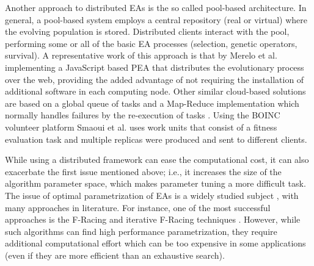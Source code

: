 Another approach to distributed EAs is the so called pool-based architecture. In general, a 
pool-based system employs a central repository (real or virtual) where the evolving population is stored.
Distributed clients interact with the pool, performing some or all of the basic EA processes 
(selection, genetic operators, survival). A representative work of this approach 
is that by Merelo et al. \cite{agajaj} implementing a JavaScript based PEA that distributes 
the evolutionary process over the web, providing the added advantage of not requiring the 
installation of additional software in each computing node.  Other similar cloud-based solutions 
are based on a global queue of tasks and a Map-Reduce implementation which normally handles failures 
by the re-execution of  tasks \cite{fazenda2012,di2013towards,FlexGP}. Using the BOINC 
volunteer platform  Smaoui et al. \cite{FekiNG09} uses work units that consist of a fitness 
evaluation task and multiple replicas  were produced and sent to different clients.

While using a distributed framework can ease the computational cost, it can also exacerbate the first issue mentioned above;
i.e., it increases the size of the algorithm parameter space, which makes parameter tuning a more difficult task.
The issue of optimal parametrization of EAs is a widely studied subject \cite{de2007parameter}, 
with many approaches in literature. For instance, one of the most successful approaches 
is the F-Racing and iterative F-Racing techniques \cite{lopez2011irace}. 
However, while such algorithms can find high performance parametrization, 
they require additional computational effort which can be too expensive in some applications
(even if they are more efficient than an exhaustive search).

